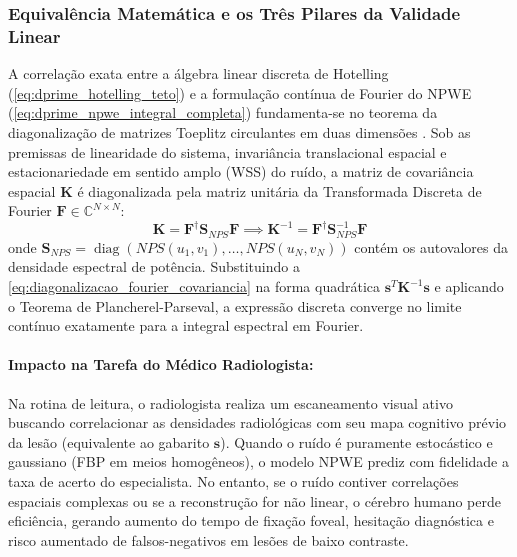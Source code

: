 \documentclass[
  12pt,
  a4paper,
  oneside
]{report}
\begin{document}
\subsubsection{Equivalência Matemática e os Três Pilares da Validade Linear}
A correlação exata entre a álgebra linear discreta de Hotelling (\cref{eq:dprime_hotelling_teto}) e a formulação contínua de Fourier do NPWE (\cref{eq:dprime_npwe_integral_completa}) fundamenta-se no teorema da diagonalização de matrizes Toeplitz circulantes em duas dimensões \cite{barrett_myers_2004}. Sob as premissas de linearidade do sistema, invariância translacional espacial e estacionariedade em sentido amplo (WSS) do ruído, a matriz de covariância espacial $\mathbf{K}$ é diagonalizada pela matriz unitária da Transformada Discreta de Fourier $\mathbf{F} \in \mathbb{C}^{N \times N}$:
\begin{equation}
  \mathbf{K} = \mathbf{F}^\dagger \mathbf{S}_{NPS} \mathbf{F} \implies \mathbf{K}^{-1} = \mathbf{F}^\dagger \mathbf{S}_{NPS}^{-1} \mathbf{F}
  \label{eq:diagonalizacao_fourier_covariancia}
\end{equation}
onde $\mathbf{S}_{NPS} = \operatorname{diag}\left( NPS(u_1, v_1), \dots, NPS(u_N, v_N) \right)$ contém os autovalores da densidade espectral de potência. Substituindo a \cref{eq:diagonalizacao_fourier_covariancia} na forma quadrática $\mathbf{s}^T \mathbf{K}^{-1} \mathbf{s}$ e aplicando o Teorema de Plancherel-Parseval, a expressão discreta converge no limite contínuo exatamente para a integral espectral em Fourier.

\paragraph{Impacto na Tarefa do Médico Radiologista:} Na rotina de leitura, o radiologista realiza um escaneamento visual ativo buscando correlacionar as densidades radiológicas com seu mapa cognitivo prévio da lesão (equivalente ao gabarito $\mathbf{s}$). Quando o ruído é puramente estocástico e gaussiano (FBP em meios homogêneos), o modelo NPWE prediz com fidelidade a taxa de acerto do especialista. No entanto, se o ruído contiver correlações espaciais complexas ou se a reconstrução for não linear, o cérebro humano perde eficiência, gerando aumento do tempo de fixação foveal, hesitação diagnóstica e risco aumentado de falsos-negativos em lesões de baixo contraste.
\end{document}

